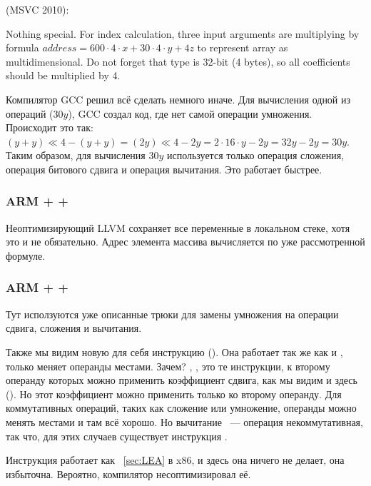  (MSVC 2010):



{Nothing special. For index calculation, three input arguments are multiplying 
by formula $address=600 \cdot 4 \cdot x + 30 \cdot 4 \cdot y + 4z$ to represent array as multidimensional.
Do not forget that \Tint type is 32-bit (4 bytes), so all coefficients should be multiplied by 4.}



Компилятор GCC решил всё сделать немного иначе. 
Для вычисления одной из операций ($30y$), GCC создал код, где нет самой операции умножения. 
Происходит это так: $(y+y) \ll 4 - (y+y) = (2y) \ll 4 - 2y = 2 \cdot 16 \cdot y - 2y = 32y - 2y = 30y$. 
Таким образом, для вычисления $30y$
используется только операция сложения, операция битового сдвига и операция вычитания. Это работает быстрее.

\subsubsection{ARM + \NonOptimizingXcode + \ThumbMode}



Неоптимизирующий LLVM сохраняет все переменные в локальном стеке, хотя это и не обязательно. 
Адрес элемента массива вычисляется по уже рассмотренной формуле.

\subsubsection{ARM + \OptimizingXcode + \ThumbMode}



Тут исползуются уже описанные трюки для замены умножения на операции сдвига, сложения и вычитания.

Также мы видим новую для себя инструкцию  (). 
Она работает так же как и \SUB, только меняет операнды
местами. Зачем? \SUB, , это те инструкции, к второму операнду которых можно применить коэффициент сдвига, как мы видим
и здесь (). Но этот коэффициент можно применить только ко второму операнду. 
Для коммутативных операций, таких
как сложение или умножение, операнды можно менять местами и там всё хорошо. Но вычитание ~--- операция некоммутативная,
так что, для этих случаев существует инструкция .

Инструкция  работает как \LEA~\ref{sec:LEA} в x86, и здесь она ничего не делает, она избыточна. 
Вероятно, компилятор несоптимизировал её.

